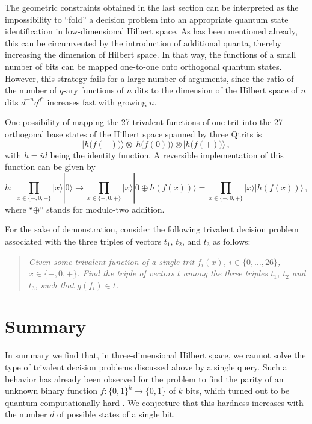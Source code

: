 \documentclass[pra,amsfonts,showpacs,showkeys,preprint]{revtex4}
\begin{document}
The geometric constraints obtained in the last section can be interpreted
as the impossibility to ``fold'' a decision problem
into an appropriate quantum state identification in low-dimensional Hilbert space.
As has been mentioned already, this can be circumvented by the introduction of additional quanta,
thereby increasing the dimension of Hilbert space.
In that way, the functions of a small number of bits can be mapped one-to-one onto orthogonal quantum states.
However, this strategy fails for a large number of arguments, since the ratio
of the number of $q$-ary functions of $n$ dits to the dimension of the Hilbert space of $n$ dits
$d^{-n} q^{d^n}$ increases fast with growing $n$.

One possibility of mapping the 27 trivalent functions of one trit into the 27 orthogonal base states of the Hilbert space spanned by three Qtrits
is
$$|h\bigl(f(-)\bigr)\rangle \otimes
    |h\bigl(f(0)\bigr)\rangle \otimes
    |h\bigl(f(+)\bigr)\rangle\,,$$
with $h= id$ being the identity function.
A reversible implementation of this function can be given by
$$
h:\;
\prod_{x \in \{-,0,+\}} \vert x\rangle |0\rangle
\rightarrow
\prod_{x \in \{-,0,+\}} \vert x\rangle |0\oplus h(f(x))\rangle =
\prod_{x \in \{-,0,+\}} \vert x\rangle |h(f(x))\rangle
\,
,$$
where ``$\oplus$'' stands for modulo-two addition.

For the sake of demonstration, consider the following trivalent decision problem associated with the three triples of vectors
$t_1$,
$t_2$, and
$t_3$ as follows:
\begin{quote}
{\em
Given some trivalent function of a single trit $f_i (x)$, $i\in \{0,\ldots ,26\}$, $x\in \{-,0,+\}$.
Find the triple of vectors $t$ among the three triples
$t_1$,
$t_2$ and
$t_3$, such that
$g(f_i)\in t$.
}
\end{quote}


\section{Summary}

In summary we find that, in three-dimensional Hilbert space, we cannot solve the type of trivalent decision problems
discussed above by a single query.
Such a behavior has already been observed for the problem to find the
parity of an unknown binary function $f:\{0,1\}^k \rightarrow \{0,1\}$ of $k$ bits,
which turned out to be quantum computationally hard
\cite{Farhi-98,bbcmw-01,Miao-2001,orus-04,stadelhofer-05}.
We conjecture that this hardness increases with the number $d$ of possible states of a single bit.
\end{document}
